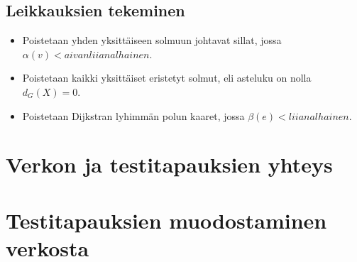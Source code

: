   \subsection{Leikkauksien tekeminen} \label{ch:10_leikkauksien_tekeminen}

    \begin{itemize}
      \item Poistetaan yhden yksittäiseen solmuun johtavat sillat, jossa \(\alpha(v) < aivan liian alhainen \).
      \item Poistetaan kaikki yksittäiset eristetyt solmut, eli asteluku on nolla \(d_G(X) = 0\).
      \item Poistetaan Dijkstran lyhimmän polun kaaret, jossa \(\beta(e) < liian alhainen \).
    \end{itemize}

\section{Verkon ja testitapauksien yhteys} \label{ch:10_verkon_ja_testitapauksien_yhteys}


\section{Testitapauksien muodostaminen verkosta} \label{ch:10_testitapauksien_muodostaminen_verkosta}

